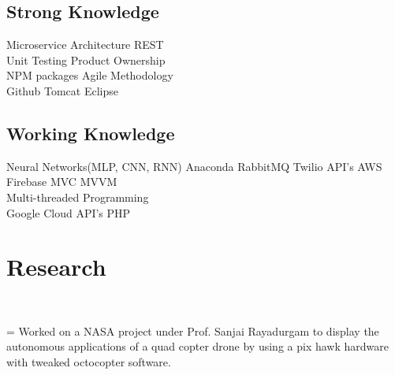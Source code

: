 \documentclass[]{rinkal_resume}
\begin{document}
\begin{minipage}[t]{0.30\textwidth}
\vspace{1pt}
\subsection{Strong Knowledge}
\vspace{1pt}
Microservice Architecture \textbullet{}
REST \textbullet{} \\
Unit Testing \textbullet{}
Product Ownership \textbullet{} \\
NPM packages \textbullet{}
Agile Methodology \textbullet{} \\
Github \textbullet{} 
Tomcat \textbullet{}
Eclipse %
\sectionsep

\vspace{1pt}
\subsection{Working Knowledge}
\vspace{1pt}
Neural Networks(MLP, CNN, RNN)  \textbullet{}
Anaconda \textbullet{}
RabbitMQ \textbullet{}
Twilio API's \textbullet{}
AWS \textbullet{}
Firebase \textbullet{}
MVC \textbullet{}
MVVM \textbullet{} \\
Multi-threaded Programming  \textbullet{} \\
Google Cloud API's\textbullet{} 
PHP %
\sectionsep


\section{Research}
 \\

\newlength\boxwid
\settowidth{\boxwid}{\indent\hspace{0.5cm}}

\hspace{0.2cm} \hangindent=\boxwid 
\textbullet{} Worked on a NASA project under Prof. Sanjai Rayadurgam to display the autonomous applications of a quad copter drone by using a pix hawk hardware with tweaked octocopter software. \\


\end{minipage}
\end{document}
